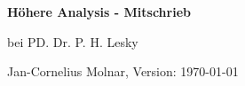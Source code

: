 \documentclass[paper=a5,fleqn,DIV=calc]{scrartcl}
\theoremstyle{graymarginwithblueheader}
\theoremstyle{graymarginwithyellowheader}
\theoremstyle{graymarginwithitblackheader}
\theoremstyle{graymarginwithblueheadern}
\theoremstyle{graymarginwithyellowheadern}
\theoremstyle{graymarginwithitblackheadern}
\begin{document}
\begin{center}
{\huge\bf Höhere Analysis - Mitschrieb}

bei PD. Dr. P. H. Lesky

Jan-Cornelius Molnar, Version: \today\ \thistime
\end{center}

\tableofcontents

\newpage


\newpage


\newpage

\end{document}
